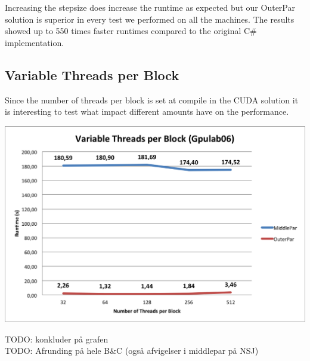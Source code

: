 Increasing the stepsize does increase the runtime as expected but our OuterPar solution is superior in every test we performed on all the machines. The results showed up to 550 times faster runtimes compared to the original C\# implementation.

\subsection{Variable Threads per Block}
Since the number of threads per block is set at compile in the CUDA solution it is interesting to test what impact different amounts have on the performance.

\begin{center}
	\includegraphics[width=\textwidth]{img/Gpulab-tpb.png}
\end{center}
TODO: konkluder på grafen \\

TODO:
Afrunding på hele B\&C (også afvigelser i middlepar på NSJ)
